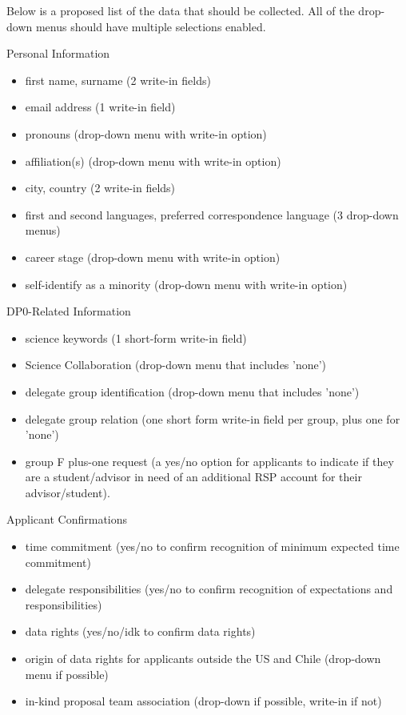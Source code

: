 \documentclass[DM,lsstdraft,authoryear,toc]{lsstdoc}
\begin{document}
Below is a proposed list of the data that should be collected.
All of the drop-down menus should have multiple selections enabled.

Personal Information
\begin{itemize}
\item first name, surname (2 write-in fields)
\item email address (1 write-in field)
\item pronouns (drop-down menu with write-in option)
\item affiliation(s) (drop-down menu with write-in option)
\item city, country (2 write-in fields)
\item first and second languages, preferred correspondence language (3 drop-down menus)
\item career stage (drop-down menu with write-in option)
\item self-identify as a minority (drop-down menu with write-in option)
\end{itemize}

DP0-Related Information
\begin{itemize}
\item science keywords (1 short-form write-in field)
\item Science Collaboration (drop-down menu that includes 'none')
\item delegate group identification (drop-down menu that includes 'none')
\item delegate group relation (one short form write-in field per group, plus one for 'none')
\item group F plus-one request (a yes/no option for applicants to indicate if they are a student/advisor in need of an additional RSP account for their advisor/student).
\end{itemize}

Applicant Confirmations
\begin{itemize}
\item time commitment (yes/no to confirm recognition of minimum expected time commitment)
\item delegate responsibilities (yes/no to confirm recognition of expectations and responsibilities)
\item data rights (yes/no/idk to confirm data rights)
\item origin of data rights for applicants outside the US and Chile (drop-down menu if possible)
\item in-kind proposal team association (drop-down if possible, write-in if not)
\end{itemize}
\end{document}
